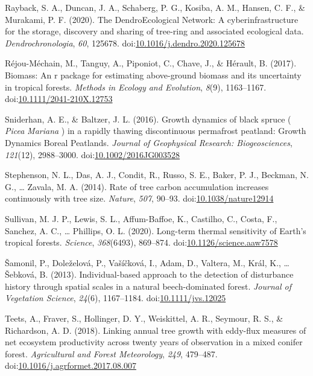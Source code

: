 \documentclass[
]{article}
\newlength{\cslhangindent}
\newenvironment{cslreferences}%
  {\setlength{\parindent}{0pt}%
  \everypar{\setlength{\hangindent}{\cslhangindent}}\ignorespaces}%
  {\par}
\begin{document}
\begin{cslreferences}
\leavevmode\hypertarget{ref-rayback_dendroecological_2020}{}%
Rayback, S. A., Duncan, J. A., Schaberg, P. G., Kosiba, A. M., Hansen,
C. F., \& Murakami, P. F. (2020). The DendroEcological Network: A
cyberinfrastructure for the storage, discovery and sharing of tree-ring
and associated ecological data. \emph{Dendrochronologia}, \emph{60},
125678.
doi:\href{https://doi.org/10.1016/j.dendro.2020.125678}{10.1016/j.dendro.2020.125678}

\leavevmode\hypertarget{ref-rejoumechain_biomass_2017}{}%
Réjou-Méchain, M., Tanguy, A., Piponiot, C., Chave, J., \& Hérault, B.
(2017). Biomass: An r package for estimating above-ground biomass and
its uncertainty in tropical forests. \emph{Methods in Ecology and
Evolution}, \emph{8}(9), 1163--1167.
doi:\href{https://doi.org/10.1111/2041-210X.12753}{10.1111/2041-210X.12753}

\leavevmode\hypertarget{ref-sniderhan_growth_2016}{}%
Sniderhan, A. E., \& Baltzer, J. L. (2016). Growth dynamics of black
spruce ( \emph{Picea} \emph{Mariana} ) in a rapidly thawing
discontinuous permafrost peatland: Growth Dynamics Boreal Peatlands.
\emph{Journal of Geophysical Research: Biogeosciences}, \emph{121}(12),
2988--3000.
doi:\href{https://doi.org/10.1002/2016JG003528}{10.1002/2016JG003528}

\leavevmode\hypertarget{ref-stephenson_rate_2014}{}%
Stephenson, N. L., Das, A. J., Condit, R., Russo, S. E., Baker, P. J.,
Beckman, N. G., \ldots{} Zavala, M. A. (2014). Rate of tree carbon
accumulation increases continuously with tree size. \emph{Nature},
\emph{507}, 90--93.
doi:\href{https://doi.org/10.1038/nature12914}{10.1038/nature12914}

\leavevmode\hypertarget{ref-sullivan_long-term_2020}{}%
Sullivan, M. J. P., Lewis, S. L., Affum-Baffoe, K., Castilho, C., Costa,
F., Sanchez, A. C., \ldots{} Phillips, O. L. (2020). Long-term thermal
sensitivity of Earth's tropical forests. \emph{Science},
\emph{368}(6493), 869--874.
doi:\href{https://doi.org/10.1126/science.aaw7578}{10.1126/science.aaw7578}

\leavevmode\hypertarget{ref-samonil_individual-based_2013}{}%
Šamonil, P., Doleželová, P., Vašíčková, I., Adam, D., Valtera, M., Král,
K., \ldots{} Šebková, B. (2013). Individual-based approach to the
detection of disturbance history through spatial scales in a natural
beech-dominated forest. \emph{Journal of Vegetation Science},
\emph{24}(6), 1167--1184.
doi:\href{https://doi.org/10.1111/jvs.12025}{10.1111/jvs.12025}

\leavevmode\hypertarget{ref-teets_linking_2018}{}%
Teets, A., Fraver, S., Hollinger, D. Y., Weiskittel, A. R., Seymour, R.
S., \& Richardson, A. D. (2018). Linking annual tree growth with
eddy-flux measures of net ecosystem productivity across twenty years of
observation in a mixed conifer forest. \emph{Agricultural and Forest
Meteorology}, \emph{249}, 479--487.
doi:\href{https://doi.org/10.1016/j.agrformet.2017.08.007}{10.1016/j.agrformet.2017.08.007}


\end{cslreferences}
\end{document}
